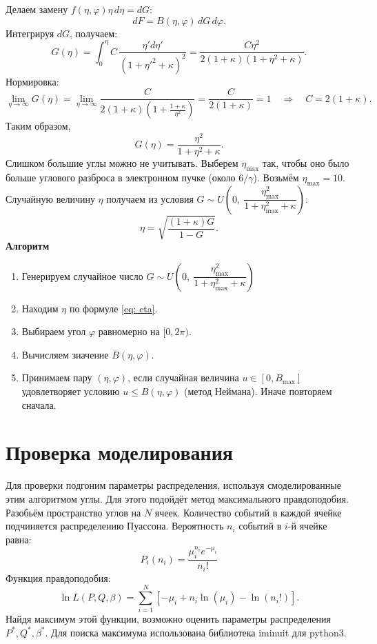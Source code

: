 \documentclass[14pt, a4paper]{extreport}
\begin{document}
Делаем замену $f(\eta, \varphi)\eta\, d\eta = dG$:
\begin{equation}
dF = B(\eta, \varphi)\, dG\, d\varphi.
\end{equation}
Интегрируя $dG$, получаем:
\begin{equation}
G(\eta) = \int_0^\eta C\,\frac{\eta' d\eta'}{(1+\eta'^2+\kappa)^2} 
= \frac{C\eta^2}{2(1+\kappa)(1+\eta^2+\kappa)}.
\end{equation}
Нормировка:
\begin{equation}
\lim_{\eta \to \infty} G(\eta) = \lim_{\eta \to \infty} 
\frac{C}{2(1+\kappa)\left(1 + \frac{1+\kappa}{\eta^2}\right)} 
= \frac{C}{2(1+\kappa)} = 1 \quad\Rightarrow\quad C = 2(1+\kappa).
\end{equation}
Таким образом,
\begin{equation}
G(\eta) = \frac{\eta^2}{1 + \eta^2 + \kappa}.
\end{equation}
Слишком большие углы можно не учитывать. Выберем $\eta_{\text{max}}$ так, чтобы оно было больше углового разброса в электронном пучке (около $6/\gamma$). Возьмём $\eta_{\text{max}} = 10$.
Случайную величину $\eta$ получаем из условия $G \sim U\!\left(0,\ \dfrac{\eta_{\text{max}}^2}{1+\eta_{\text{max}}^2+\kappa}\right)$:
\begin{equation}
\label{eq: eta}
\eta = \sqrt{\frac{(1+\kappa)G}{1-G}}.
\end{equation}
\textbf{Алгоритм}
\begin{enumerate}
    \item Генерируем случайное число $G \sim U\!\left(0,\ \dfrac{\eta_{\text{max}}^2}{1+\eta_{\text{max}}^2+\kappa}\right)$
    \item Находим $\eta$ по формуле \eqref{eq: eta}.
    \item Выбираем угол $\varphi$ равномерно на $[0, 2\pi)$.
    \item Вычисляем значение $B(\eta,\varphi)$.
    \item Принимаем пару $(\eta,\varphi)$, если случайная величина 
          $u \in [0, B_{\text{max}}]$ удовлетворяет условию $u \le B(\eta,\varphi)$ 
          (метод Неймана). Иначе повторяем сначала.
\end{enumerate}
\section{Проверка моделирования}
Для проверки подгоним параметры распределения, используя смоделированные этим алгоритмом углы. Для этого подойдёт метод максимального правдоподобия.
Разобьём пространство углов на $N$ ячеек. Количество событий в каждой ячейке подчиняется распределению Пуассона.
Вероятность $n_i$ событий в $i$-й ячейке равна:
\begin{equation}
P_i(n_i) = \dfrac{\mu_i^{n_i}e^{-\mu_i}}{n_i!}
\end{equation}
Функция правдоподобия:
\begin{equation}
\ln L\left(P,Q,\beta \right) = \sum_{i=1}^N \left[-\mu_i + n_i \ln(\mu_i) - \ln(n_i!) \right].
\end{equation}
Найдя максимум этой функции, возможно оценить параметры распределения $P^*, Q^*, \beta^*$. Для поиска максимума использована библиотека iminuit для python3.
\end{document}
